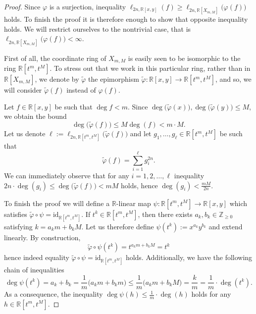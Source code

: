 \documentclass[10pt,a4paper]{amsart}
\newcommand{\R}{\mathbb{R}}
\newcommand{\Z}{\mathbb{Z}}
\begin{document}
\begin{proof}
    Since $\varphi$ is a surjection, inequality $\ell_{2n, \R[x,y]} (f) \geq \ell_{2n,\R[X_{m,M}]}\big(\varphi(f)\big)$ holds. To finish the proof it is therefore enough to show that opposite inequality holds. We will restrict ourselves to the nontrivial case, that is $\ell_{2n,\R[X_{m,M}]}\big(\varphi(f)\big) < \infty$.

   
First of all, the coordinate ring of $X_{m,M}$ is easily seen to be isomorphic to the ring $\R[t^m,t^M]$. To stress out that we work in this particular ring, rather than in $\R[X_{m,M}]$, we denote by $\widetilde{\varphi}$ the epimorphism $\widetilde{\varphi}: \R[x,y] \rightarrow \R[t^m,t^M]$, and so, we will consider $\widetilde{\varphi}(f)$ instead of $\varphi(f)$.

    
Let $f \in \R[x,y]$ be such that $\deg f <m$. Since $\deg\big(\widetilde{\varphi}(x)\big), \deg\big(\widetilde{\varphi}(y)\big) \leq M$, we obtain the bound 
    $$
    \deg\big(
    \widetilde{\varphi}(f)
    \big) \leq M \deg(f) < m\cdot M.
    $$
    Let us denote $\ell := \ell_{2n,\R[t^m,t^M]}
    \big(
    \widetilde{\varphi}(f)
    \big)$ and let $g_1,\ldots,g_\ell \in \R[t^m,t^M]$ be such that
    $$
     \widetilde{\varphi}(f) = \sum_{i=1}^\ell g_i^{2n}.
    $$
    We can immediately observe that for any $i =1,2,\dots,\ell$ inequality $2n \cdot \deg(g_i) \leq \deg\big(
    \widetilde{\varphi}(f)
    \big) < m M$ holds, hence $\deg(g_i) < \frac{mM}{2n}$. 
    
    To finish the proof we will define a $\R$-linear map $\psi: \R[t^m,t^M] \rightarrow \R[x,y]$ which satisfies $\widetilde{\varphi} \circ \psi = \mathrm{id}_{\R[t^m,t^M]}$. If $t^k \in \R[t^m,t^M]$, then there exists $a_k,b_k \in \Z_{\geq 0}$ satisfying $k = a_k m + b_k M$. Let us therefore define $\psi(t^k) := x^{a_k} y^{b_k}$ and extend linearly. By construction,  $$\widetilde{\varphi} \circ \psi(t^k) = t^{a_k m + b_k M} = t^k$$ hence indeed equality $\widetilde{\varphi} \circ \psi = \mathrm{id}_{\R[t^m,t^M]}$ holds. Additionally, we have the following chain of inequalities
    $$
    \deg \psi(t^k) = a_k + b_k = \frac{1}{m} \big( a_k m + b_k m\big) \leq \frac{1}{m} \big(a_km +  b_kM\big) = \frac{k}{m} = \frac{1}{m} \cdot \deg(t^k).
    $$
    As a consequence, the inequality $\deg \psi(h) \leq \frac{1}{m} \cdot \deg(h)$ holds for any $h \in \R[t^m,t^M]$.


\end{proof}
\end{document}

